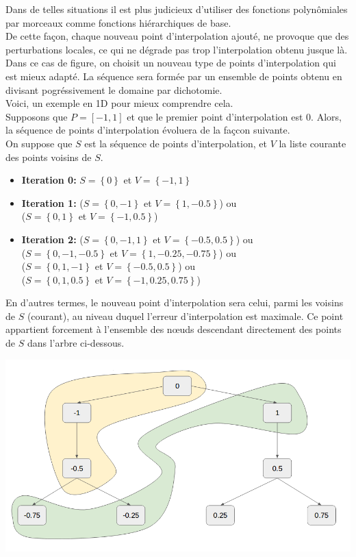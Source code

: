 \hspace{0.5cm}Dans de telles situations il est plus judicieux d'utiliser des fonctions polynômiales par morceaux comme fonctions hiérarchiques de base.\\
De cette façon, chaque nouveau point d'interpolation ajouté, ne provoque que des perturbations locales, ce qui ne dégrade pas trop l'interpolation obtenu jusque là.\\
Dans ce cas de figure, on choisit un nouveau type de points d'interpolation qui est mieux adapté. La séquence sera formée par un ensemble de points obtenu en divisant pogréssivement
le domaine par dichotomie.\\
Voici, un exemple en 1D pour mieux comprendre cela.\\
Supposons que $P = \left [ -1, 1 \right ]$ et que le premier point d'interpolation est $0$. Alors, la séquence de points d'interpolation évoluera
de la façcon suivante.\\
On suppose que $S$ est la séquence de points d'interpolation, et $V$ la liste courante des points voisins de $S$.
\begin{itemize}
\item \textbf{Iteration 0:} $S = \left \{ 0 \right \}$ et $V = \left \{ -1,1 \right \}$
\item \textbf{Iteration 1:} ($S = \left \{ 0, -1 \right \}$ et $V = \left \{ 1, -0.5 \right \}$) ou \\
($S = \left \{ 0, 1 \right \}$ et $V = \left \{ -1, 0.5 \right \}$)
\item \textbf{Iteration 2:} ($S = \left \{ 0, -1, 1\right \}$ et $V = \left \{ -0.5, 0.5 \right \}$) ou \\
($S = \left \{ 0, -1, -0.5 \right \}$ et $V = \left \{ 1, -0.25, -0.75\right \}$) ou \\
($S = \left \{ 0, 1, -1 \right \}$ et $V = \left \{ -0.5, 0.5\right \}$) ou \\
($S = \left \{ 0, 1, 0.5 \right \}$ et $V = \left \{ -1, 0.25, 0.75\right \}$)
\end{itemize}
En d'autres termes, le nouveau point d'interpolation sera celui, parmi les voisins de $S$ (courant), au niveau duquel l'erreur d'interpolation est maximale.
Ce point appartient forcement à l'ensemble des nœuds descendant directement des points de $S$ dans l'arbre ci-dessous.
\begin{center}
\includegraphics[height= 6 cm,width = 9 cm]{images/tree.png}
\end{center}
